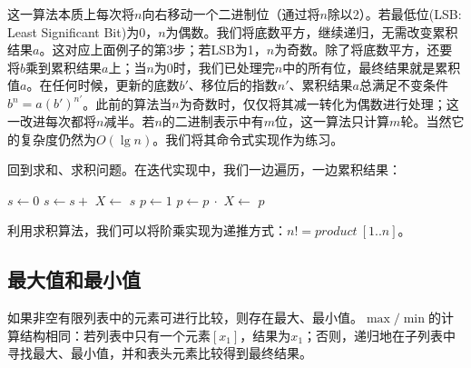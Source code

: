 \documentclass[b5paper]{ctexart}
\begin{document}
这一算法本质上每次将$n$向右移动一个二进制位（通过将$n$除以2）。若最低位(LSB: Least Significant Bit)为0，$n$为偶数。我们将底数平方，继续递归，无需改变累积结果$a$。这对应上面例子的第3步；若LSB为1，$n$为奇数。除了将底数平方，还要将$b$乘到累积结果$a$上；当$n$为0时，我们已处理完$n$中的所有位，最终结果就是累积值$a$。在任何时候，更新的底数$b'$、移位后的指数$n'$、累积结果$a$总满足不变条件$b^n = a (b')^{n'}$。此前的算法当$n$为奇数时，仅仅将其减一转化为偶数进行处理；这一改进每次都将$n$减半。若$n$的二进制表示中有$m$位，这一算法只计算$m$轮。当然它的复杂度仍然为$O(\lg n)$。我们将其命令式实现作为练习。

回到求和、求积问题。在迭代实现中，我们一边遍历，一边累积结果：

\begin{algorithmic}[1]
  \State $s \gets 0$
    \State $s \gets s +$ 
    \State $X \gets$ 
  \EndWhile
  \State \Return $s$
\EndFunction
\Statex
{}
  \State $p \gets 1$
    \State $p \gets p\ \cdot$ 
    \State $X \gets$ 
  \EndWhile
  \State \Return $p$
\EndFunction
\end{algorithmic}

利用求积算法，我们可以将阶乘实现为递推方式：$n! = product\ [1..n]$。

\subsection{最大值和最小值}
 

如果非空有限列表中的元素可进行比较，则存在最大、最小值。$\max/\min$的计算结构相同：若列表中只有一个元素$[x_1]$，结果为$x_1$；否则，递归地在子列表中寻找最大、最小值，并和表头元素比较得到最终结果。

\be
{}
\ee
\end{document}
